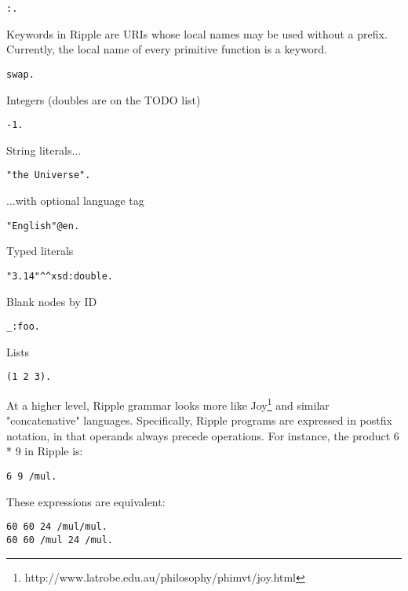 \documentclass[runningheads]{llncs}
\begin{document}
\begin{verbatim}
:.
\end{verbatim}

Keywords in Ripple are URIs whose local names may be used without a prefix.
Currently, the local name of every primitive function is a keyword.

\begin{verbatim}
swap.
\end{verbatim}

Integers (doubles are on the TODO list)

\begin{verbatim}
-1.
\end{verbatim}

String literals...

\begin{verbatim}
"the Universe".
\end{verbatim}

...with optional language tag

\begin{verbatim}
"English"@en.
\end{verbatim}

Typed literals

\begin{verbatim}
"3.14"^^xsd:double.
\end{verbatim}

Blank nodes by ID

\begin{verbatim}
_:foo.
\end{verbatim}

Lists

\begin{verbatim}
(1 2 3).
\end{verbatim}

At a higher level, Ripple grammar looks more like Joy\footnote{http://www.latrobe.edu.au/philosophy/phimvt/joy.html} and similar "concatenative" languages.  Specifically, Ripple programs are expressed in postfix notation, in that operands always precede operations.  For instance, the product 6 * 9 in Ripple is:

\begin{verbatim}
6 9 /mul.
\end{verbatim}

These expressions are equivalent:

\begin{verbatim}
60 60 24 /mul/mul.
60 60 /mul 24 /mul.
\end{verbatim}
\end{document}
